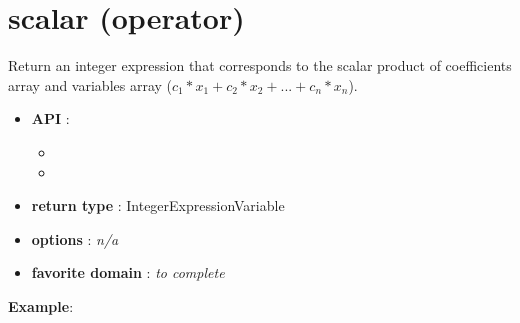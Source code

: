 \label{scalar}
\hypertarget{scalar}{}

\section{scalar (operator)}\label{scalar:scalaroperator}\hypertarget{scalar:scalaroperator}{}
Return an integer expression that corresponds to the scalar product of coefficients array and variables array (\(c_1*x_1+c_2*x_2+...+c_n*x_n\)).

\begin{itemize}
	\item \textbf{API} :
	\begin{itemize}
		\item {}
		\item {}
	\end{itemize}
	\item \textbf{return type} : IntegerExpressionVariable
	\item \textbf{options} : \emph{n/a}
	\item \textbf{favorite domain} : \emph{to complete}
\end{itemize}

\textbf{Example}:


